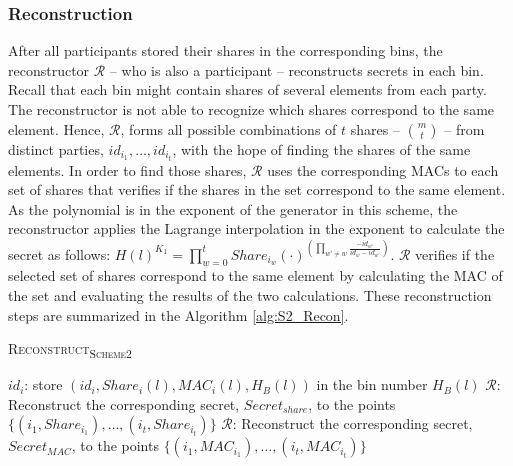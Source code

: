\subsubsection{Reconstruction}\label{Recon_S2}
After all participants stored their shares in the corresponding bins, the reconstructor  $\mathcal{R}$ -- who is also a participant -- reconstructs secrets in each bin. Recall that each bin might contain shares of several elements from each party. The reconstructor is not able to recognize which shares correspond to the same element. Hence, $\mathcal{R}$, forms all possible combinations of $t$ shares -- $m \choose t$ -- from distinct parties, $id_{i_1}, \dots, id_{i_t}$, with the hope of finding the shares of the same elements. In order to find those shares, $\mathcal{R}$ uses the corresponding MACs to each set of shares that verifies if the shares in the set correspond to the same element. As the polynomial is in the exponent of the generator in this scheme, the reconstructor applies the Lagrange interpolation in the exponent to calculate the secret as follows: $H(l)^{K_1} = \prod^t_{w=0} Share_{i_w}(\cdot)^{(\prod_{w' \neq w} \frac{-id_{w'}}{id_w - id_{w'}})}$. $\mathcal{R}$ verifies if the selected set of shares correspond to the same element by calculating the MAC of the set and evaluating the results of the two calculations. These reconstruction steps are summarized in the Algorithm \ref{alg:S2_Recon}. 

\begin{algorithm}[h!]
	 \caption[\textsc{Reconstruct\textsubscript{Scheme2}}]{\textsc{Reconstruct\textsubscript{Scheme2}}}\label{alg:S2_Recon}
	 	\begin{algorithmic}[1]
                    \State $id_i$: store $(id_i, Share_i(l), MAC_i(l), H_B(l))$ in the bin number $H_B(l)$
                    \State
	 	        \EndFor
	 	    \EndFor 
	 	            \State $\mathcal{R}$: Reconstruct the corresponding secret, $Secret_{share}$, to the points $\{({i_1}, Share_{i_1}), \dots, ({i_t}, Share_{i_t})\}$
	 	            \State $\mathcal{R}$: Reconstruct the corresponding secret, $Secret_{MAC}$, to the points $\{({i_1}, MAC_{i_1}), \dots, ({i_t}, MAC_{i_t})\}$
	 	            \EndIf 
	 	        \EndFor
	 	    \EndFor
	 	\end{algorithmic}
\end{algorithm}

